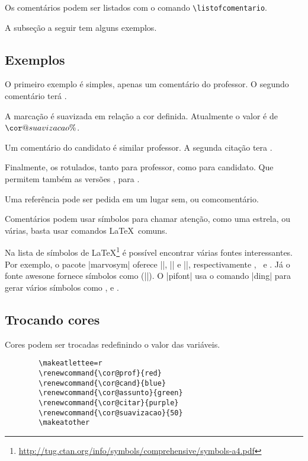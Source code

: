 \documentclass{article}
\begin{document}
    Os comentários podem ser listados com o comando \verb!\listofcomentario!.
    
    A subseção a seguir  tem alguns exemplos.
    
    \subsection{Exemplos}
    
    O primeiro exemplo é simples, apenas um comentário do professor.
    O segundo comentário terá .
    
    A marcação é suavizada em relação a cor definida. Atualmente o valor é de \makeatletter$\cor@suavizacao\%$\makeatother.
    
    Um comentário do candidato é similar professor. A segunda citação tera .
    
    Finalmente, os rotulados, tanto para professor, como para candidato. Que permitem também as versões , para .
    
    Uma referência pode ser pedida em um lugar sem\favorcitar, ou com\favorcitar[o experimento] comentário.
    
    Comentários podem usar símbolos para chamar atenção, como uma estrela, ou várias, basta usar comandos \LaTeX\  comuns.
    
    Na lista de símbolos de \LaTeX\footnote{\url{http://tug.ctan.org/info/symbols/comprehensive/symbols-a4.pdf}} é possível encontrar várias fontes interessantes. Por exemplo, o pacote |marvosym| oferece |\Checkedbox|, |\CrossedBox| e |\HollowBox|, respectivamente \Checkedbox, \CrossedBox \  e \HollowBox. Já o fonte awesone fornece símbolos como \faCheckSquareO(|\faCheckSquareO|). O |pifont| usa o comando |ding| para gerar vários símbolos como , e .
    
    \subsection{Trocando cores}
    Cores podem ser trocadas redefinindo o valor das variáveis.
    \begin{verbatim}
        \makeatlettee=r
        \renewcommand{\cor@prof}{red}
        \renewcommand{\cor@cand}{blue}
        \renewcommand{\cor@assunto}{green}
        \renewcommand{\cor@citar}{purple}
        \renewcommand{\cor@suavizacao}{50}
        \makeatother
    \end{verbatim}
    
\end{document}

